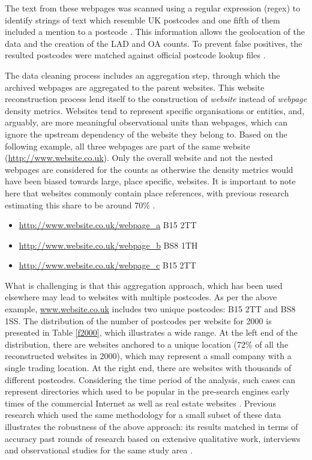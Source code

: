 \documentclass[
  authoryear,
  preprint,
  3p]{elsarticle}
\begin{document}
The text from these webpages was scanned using a regular expression
(regex) to identify strings of text which resemble UK postcodes and one
fifth of them included a mention to a postcode \citep{BL2013geo}. This
information allows the geolocation of the data and the creation of the
LAD and OA counts. To prevent false positives, the resulted postcodes
were matched against official postcode lookup files \citep{ons}.

The data cleaning process includes an aggregation step, through which
the archived webpages are aggregated to the parent websites. This
website reconstruction process lend itself to the construction of
\emph{website} instead of \emph{webpage} density metrics. Websites tend
to represent specific organisations or entities, and, arguably, are more
meaningful observational units than webpages, which can ignore the
upstream dependency of the website they belong to. Based on the
following example, all three webpages are part of the same website
(\url{http://www.website.co.uk}). Only the overall website and not the
nested webpages are considered for the counts as otherwise the density
metrics would have been biased towards large, place specific, websites.
It is important to note here that websites commonly contain place
references, with previous research estimating this share to be around
70\% \citep{hill2009georeferencing}.

\begin{itemize}
\item
  \url{http://www.website.co.uk/webpage_a} B15 2TT
\item
  \url{http://www.website.co.uk/webpage_b} BS8 1TH
\item
  \url{http://www.website.co.uk/webpage_c} B15 2TT
\end{itemize}

\noindent What is challenging is that this aggregation approach, which
has been used elsewhere \citep{tranosuk, shoreditch} may lead to
websites with multiple postcodes. As per the above example,
\href{http://www.website.co.uk}{www.website.co.uk} includes two unique
postcodes: B15 2TT and BS8 1SS. The distribution of the number of
postcodes per website for 2000 is presented in Table \ref{f2000}, which
illustrates a wide range. At the left end of the distribution, there are
websites anchored to a unique location (72\% of all the reconstructed
websites in 2000), which may represent a small company with a single
trading location. At the right end, there are websites with thousands of
different postcodes. Considering the time period of the analysis, such
cases can represent directories which used to be popular in the
pre-search engines early times of the commercial Internet as well as
real estate websites \citep{tranosuk}. Previous research which used the
same methodology for a small subset of these data illustrates the
robustness of the above approach: its results matched in terms of
accuracy past rounds of research based on extensive qualitative work,
interviews and observational studies for the same study area
\citep{shoreditch}.
\end{document}
